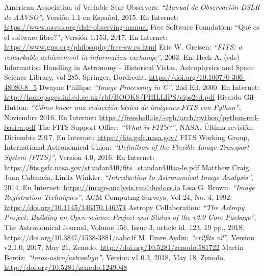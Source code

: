 \documentclass[a4paper, 12pt]{article}
\begin{document}
\begin{thebibliography}{100}
 American Association of Variable Star Observers: {\it ``Manual de Observación DSLR de AAVSO''}, Versión 1.1 en Español, 2015. En Internet: \url{https://www.aavso.org/dslr-observing-manual}
   Free Software Foundation: {``Qué es el software libre?''}, Versión 1.153, 2017. En Internet: \url{https://www.gnu.org/philosophy/free-sw.es.html}
 Eric W. Greisen: {\it ``FITS: a remarkable achievement in information exchange''}, 2003. En: Heck A. (eds) Information Handling in Astronomy - Historical Vistas. Astrophysics and Space Science Library, vol 285. Springer, Dordrecht. \url{https://doi.org/10.1007/0-306-48080-8_5}
 Dwayne Phillips: {\it ``Image Processing in C''}, 2nd Ed, 2000. En Internet: \url{http://homepages.inf.ed.ac.uk/rbf/BOOKS/PHILLIPS/cips2ed.pdf}
 Ricardo Gil-Hutton: {\it ``Cómo hacer una reducción básica de imágenes FITS con Python''}, Noviembre 2016. En Internet: \url{https://freeshell.de/~rgh/arch/python/python-red-basica.pdf}
 The FITS Support Office: {\it ``What is FITS?''}, NASA. Última revisión, Diciembre 2017.  En Internet: \url{https://fits.gsfc.nasa.gov/}
 FITS Working Group, International Astronomical Union: {\it ``Definition of the Flexible Image Transport System (FITS)''}, Version 4.0, 2016. En Internet: \url{https://fits.gsfc.nasa.gov/standard40/fits_standard40aa-le.pdf}
 Matthew Craig, Juan Cabanela, Linda Winkler: {\it ``Introduction to Astronomical Image Analysis''}, 2014. En Internet: \url{https://image-analysis.readthedocs.io}
 Lisa G. Brown: {\it ``Image Registration Techniques''}, ACM Computmg Surveys, Vol 24, No. 4, 1992. \url{https://doi.org/10.1145/146370.146374}
 Astropy Collaboration: {\it ``The Astropy Project: Building an Open-science Project and Status of the v2.0 Core Package''}, The Astronomical Journal, Volume 156, Issue 3, article id. 123, 19 pp., 2018. \url{https://doi.org/10.3847/1538-3881/aabc4f}
  M. Emre Aydin: {\it ``cr2fits v2''}, Version v2.1.0, 2017, May 21, Zenodo. \url{http://doi.org/10.5281/zenodo.581722}
 Martin Beroiz: {\it ``toros-astro/astroalign''}, Version v1.0.3, 2018, May 18. Zenodo. \url{http://doi.org/10.5281/zenodo.1249048}
\end{thebibliography}





\appendix

\end{document}
